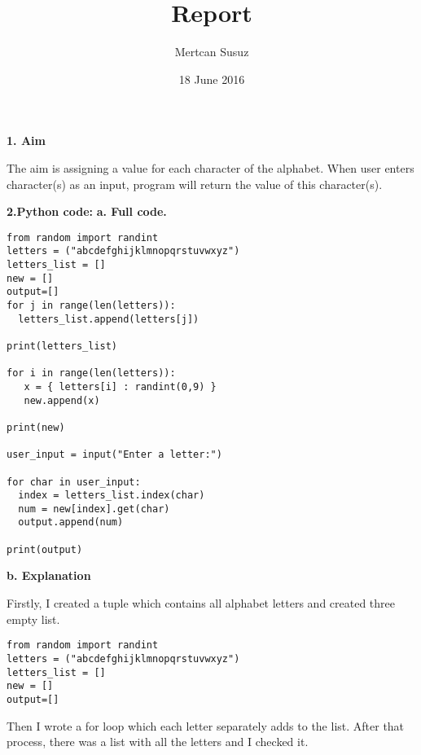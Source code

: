 \documentclass{report}
\title{Report}
\author{Mertcan Susuz}
\date{18 June 2016}
\begin{document}
\maketitle
{\Large \textbf{1. Aim}}

\begin{flushleft}
The aim is assigning a value for each character of the alphabet. When user enters character(s) as an input, program will return the value of this character(s).
\end{flushleft}




{\Large \textbf{2.Python code:}}
\newline
\newline
\textbf{{\large a. Full code.}}


\begin{lstlisting}
from random import randint
letters = ("abcdefghijklmnopqrstuvwxyz")
letters_list = []
new = []
output=[]
for j in range(len(letters)):
  letters_list.append(letters[j])

print(letters_list)

for i in range(len(letters)):
   x = { letters[i] : randint(0,9) }
   new.append(x)

print(new)

user_input = input("Enter a letter:")

for char in user_input:
  index = letters_list.index(char)
  num = new[index].get(char)
  output.append(num)

print(output)
\end{lstlisting}


\begin{flushleft}
\textbf{{\large b. Explanation}}
\end{flushleft}

\begin{flushleft}
Firstly, I created a tuple which contains all alphabet letters and created three empty list.
\end{flushleft}
\begin{lstlisting}
from random import randint
letters = ("abcdefghijklmnopqrstuvwxyz")
letters_list = []
new = []
output=[]
\end{lstlisting}

\newpage

\begin{flushleft}
Then I wrote a for loop which each letter separately adds to the list. After that process, there was a list with all the letters and I checked it.
\end{flushleft}
\end{document}
